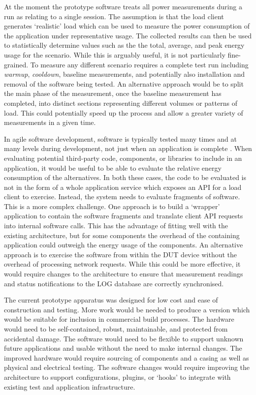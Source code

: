 At the moment the prototype software treats all power measurements during a run as relating to a single session. The assumption is that the load client generates `realistic' load which can be used to measure the power consumption of the application under representative usage. The collected results can then be used to statistically determine values such as the the total, average, and peak energy usage for the scenario. While this is arguably useful, it is not particularly fine-grained. To measure any different scenario requires a complete test run including \emph{warmup}, \emph{cooldown}, baseline measurements, and potentially also installation and removal of the software being tested. An alternative approach would be to split the main phase of the measurement, once the baseline measurement has completed, into distinct sections representing different volumes or patterns of load. This could potentially speed up the process and allow a greater variety of measurements in a given time.

In agile software development, software is typically tested many times and at many levels during development, not just when an application is complete \citep{Fowler2012}. When evaluating potential third-party code, components, or libraries to include in an application, it would be useful to be able to evaluate the relative energy consumption of the alternatives. In both these cases, the code to be evaluated is not in the form of a whole application service which exposes an API for a load client to exercise. Instead, the system needs to evaluate fragments of software. This is a more complex challenge. One approach is to build a `wrapper' application to contain the software fragments and translate client API requests into internal software calls. This has the advantage of fitting well with the existing architecture, but for some components the overhead of the containing application could outweigh the energy usage of the components. An alternative approach is to exercise the software from within the DUT device without the overhead of processing network requests. While this could be more effective, it would require changes to the architecture to ensure that measurement readings and status notifications to the LOG database are correctly synchronised.

The current prototype apparatus was designed for low cost and ease of construction and testing. More work would be needed to produce a version which would be suitable for inclusion in commercial build processes. The hardware would need to be self-contained, robust, maintainable, and protected from accidental damage. The software would need to be flexible to support unknown future applications and usable without the need to make internal changes. The improved hardware would require sourcing of components and a casing as well as physical and electrical testing. The software changes would require improving the architecture to support configurations, plugins, or `hooks' to integrate with existing test and application infrastructure.

